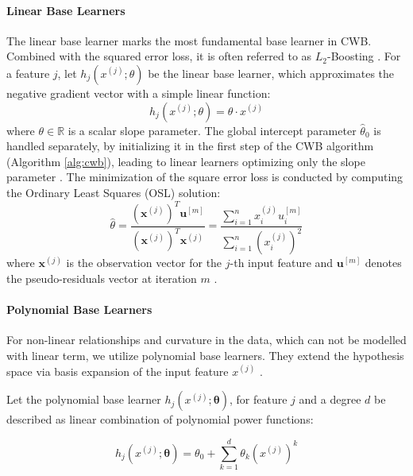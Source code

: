 \documentclass[fontsize=12 pt]{scrartcl}
\begin{document}
\paragraph{Linear Base Learners}

The linear base learner marks the most fundamental base learner in CWB. Combined with the squared error loss, it is often referred to as $L_2$-Boosting \citep{buhlmann2007boosting}. For a feature $j$, let $h_j(x^{(j)}; \theta)$ be the linear base learner, which approximates the negative gradient vector with a simple linear function:
\begin{equation}
    h_j(x^{(j)}; \theta) = \theta \cdot x^{(j)}
\end{equation}
where $\theta \in \mathbb{R}$ is a scalar slope parameter. The global intercept parameter $\hat{\theta}_0$ is handled separately, by initializing it in the first step of the CWB algorithm (Algorithm \ref{alg:cwb}), leading to linear learners optimizing only the slope parameter \citep{hofner2014model}. The minimization of the square error loss is conducted by computing the Ordinary Least Squares (OSL) solution: 
\begin{equation}
    \hat{\theta} = \frac{(\mathbf{x}^{(j)})^T \mathbf{u}^{[m]}}{(\mathbf{x}^{(j)})^T \mathbf{x}^{(j)}} = \frac{\sum_{i=1}^n x_i^{(j)} u_i^{[m]}}{\sum_{i=1}^n (x_i^{(j)})^2}
\end{equation}
where $\mathbf{x}^{(j)}$ is the observation vector for the $j$-th input feature and $\mathbf{u}^{[m]}$ denotes the pseudo-residuals vector at iteration $m$ \citep{buhlmann2007boosting}.


\paragraph{Polynomial Base Learners}

For non-linear relationships and curvature in the data, which can not be modelled with linear term, we utilize polynomial base learners. They extend the hypothesis space via basis expansion of the input feature $x^{(j)}$ \citep{hastie2009elements}.

Let the polynomial base learner $h_j(x^{(j)}; \boldsymbol{\theta})$, for feature $j$ and a degree $d$ be described as linear combination of polynomial power functions:

\begin{equation}
    h_j(x^{(j)}; \boldsymbol{\theta}) = \theta_0 + \sum_{k=1}^d \theta_k (x^{(j)})^k
\end{equation}
\end{document}
